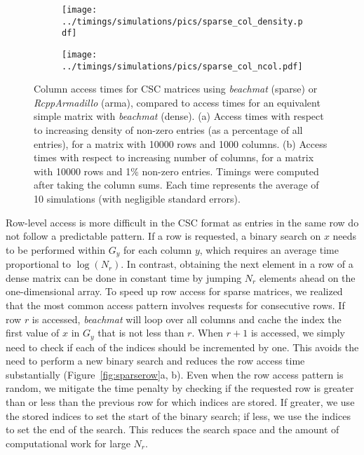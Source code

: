 \documentclass[10pt,letterpaper]{article}
\newcommand{\beachmat}{\textit{beachmat}}
\begin{document}

\begin{figure}[bt]
    \centering
    \begin{subfigure}[b]{0.49\textwidth}
        \texttt{[image: ../timings/simulations/pics/sparse\_col\_density.pdf]}
        \caption{}
    \end{subfigure}
    \begin{subfigure}[b]{0.49\textwidth}
        \texttt{[image: ../timings/simulations/pics/sparse\_col\_ncol.pdf]}
        \caption{}
    \end{subfigure}
    \caption{Column access times for CSC matrices using \beachmat{} (sparse) or \textit{RcppArmadillo} (arma), compared to access times for an equivalent simple matrix with \beachmat{} (dense).
        (a) Access times with respect to increasing density of non-zero entries (as a percentage of all entries), for a matrix with 10000 rows and 1000 columns.
        (b) Access times with respect to increasing number of columns, for a matrix with 10000 rows and 1\% non-zero entries.
        Timings were computed after taking the column sums.
        Each time represents the average of 10 simulations (with negligible standard errors).
    }
    \label{fig:sparsecol}
\end{figure}

Row-level access is more difficult in the CSC format as entries in the same row do not follow a predictable pattern.
If a row is requested, a binary search on $x$ needs to be performed within $G_y$ for each column $y$, which requires an average time proportional to $\log(N_r)$.
In contrast, obtaining the next element in a row of a dense matrix can be done in constant time by jumping $N_r$ elements ahead on the one-dimensional array.
To speed up row access for sparse matrices, we realized that the most common access pattern involves requests for consecutive rows.
If row $r$ is accessed, \beachmat{} will loop over all columns and cache the index the first value of $x$ in $G_y$ that is not less than $r$.
When $r+1$ is accessed, we simply need to check if each of the indices should be incremented by one.
This avoids the need to perform a new binary search and reduces the row access time substantially (Figure~\ref{fig:sparserow}a, b).
Even when the row access pattern is random, we mitigate the time penalty by checking if the requested row is greater than or less than the previous row for which indices are stored.
If greater, we use the stored indices to set the start of the binary search; if less, we use the indices to set the end of the search. 
This reduces the search space and the amount of computational work for large $N_r$.
\end{document}
